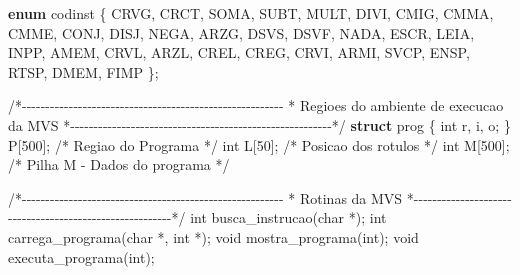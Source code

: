 \documentclass[
  brazilian,
  letterpaper,
]{book}
\newenvironment{Shaded}{\begin{snugshade}}{\end{snugshade}}
\newcommand{\CommentTok}[1]{\textcolor[rgb]{0.37,0.37,0.37}{#1}}
\newcommand{\DataTypeTok}[1]{\textcolor[rgb]{0.68,0.00,0.00}{#1}}
\newcommand{\DecValTok}[1]{\textcolor[rgb]{0.68,0.00,0.00}{#1}}
\newcommand{\KeywordTok}[1]{\textcolor[rgb]{0.00,0.23,0.31}{\textbf{#1}}}
\newcommand{\NormalTok}[1]{\textcolor[rgb]{0.00,0.23,0.31}{#1}}
\newcommand{\OperatorTok}[1]{\textcolor[rgb]{0.37,0.37,0.37}{#1}}
\theoremstyle{plain}
\theoremstyle{definition}
\theoremstyle{remark}
\begin{document}
\begin{Shaded}
\begin{Highlighting}[]
\KeywordTok{enum}\NormalTok{ codinst}
\OperatorTok{\{}
\NormalTok{    CRVG}\OperatorTok{,}
\NormalTok{    CRCT}\OperatorTok{,}
\NormalTok{    SOMA}\OperatorTok{,}
\NormalTok{    SUBT}\OperatorTok{,}
\NormalTok{    MULT}\OperatorTok{,}
\NormalTok{    DIVI}\OperatorTok{,}
\NormalTok{    CMIG}\OperatorTok{,}
\NormalTok{    CMMA}\OperatorTok{,}
\NormalTok{    CMME}\OperatorTok{,}
\NormalTok{    CONJ}\OperatorTok{,}
\NormalTok{    DISJ}\OperatorTok{,}
\NormalTok{    NEGA}\OperatorTok{,}
\NormalTok{    ARZG}\OperatorTok{,}
\NormalTok{    DSVS}\OperatorTok{,}
\NormalTok{    DSVF}\OperatorTok{,}
\NormalTok{    NADA}\OperatorTok{,}
\NormalTok{    ESCR}\OperatorTok{,}
\NormalTok{    LEIA}\OperatorTok{,}
\NormalTok{    INPP}\OperatorTok{,}
\NormalTok{    AMEM}\OperatorTok{,}
\NormalTok{    CRVL}\OperatorTok{,}
\NormalTok{    ARZL}\OperatorTok{,}
\NormalTok{    CREL}\OperatorTok{,}
\NormalTok{    CREG}\OperatorTok{,}
\NormalTok{    CRVI}\OperatorTok{,}
\NormalTok{    ARMI}\OperatorTok{,}
\NormalTok{    SVCP}\OperatorTok{,}
\NormalTok{    ENSP}\OperatorTok{,}
\NormalTok{    RTSP}\OperatorTok{,}
\NormalTok{    DMEM}\OperatorTok{,}
\NormalTok{    FIMP}
\OperatorTok{\};}

\CommentTok{/*{-}{-}{-}{-}{-}{-}{-}{-}{-}{-}{-}{-}{-}{-}{-}{-}{-}{-}{-}{-}{-}{-}{-}{-}{-}{-}{-}{-}{-}{-}{-}{-}{-}{-}{-}{-}{-}{-}{-}{-}{-}{-}{-}{-}{-}{-}{-}{-}{-}{-}{-}{-}{-}{-}{-}{-}}
\CommentTok{ * Regioes do ambiente de execucao da MVS                    }
\CommentTok{ *{-}{-}{-}{-}{-}{-}{-}{-}{-}{-}{-}{-}{-}{-}{-}{-}{-}{-}{-}{-}{-}{-}{-}{-}{-}{-}{-}{-}{-}{-}{-}{-}{-}{-}{-}{-}{-}{-}{-}{-}{-}{-}{-}{-}{-}{-}{-}{-}{-}{-}{-}{-}{-}{-}{-}{-}*/}
\KeywordTok{struct}\NormalTok{ prog}
\OperatorTok{\{}
    \DataTypeTok{int}\NormalTok{ r}\OperatorTok{,}\NormalTok{ i}\OperatorTok{,}\NormalTok{ o}\OperatorTok{;}
\OperatorTok{\}}\NormalTok{ P}\OperatorTok{[}\DecValTok{500}\OperatorTok{];} \CommentTok{/* Regiao do Programa */}
\DataTypeTok{int}
\NormalTok{    L}\OperatorTok{[}\DecValTok{50}\OperatorTok{];} \CommentTok{/* Posicao dos rotulos */}
\DataTypeTok{int}
\NormalTok{    M}\OperatorTok{[}\DecValTok{500}\OperatorTok{];} \CommentTok{/* Pilha M {-} Dados do programa */}

\CommentTok{/*{-}{-}{-}{-}{-}{-}{-}{-}{-}{-}{-}{-}{-}{-}{-}{-}{-}{-}{-}{-}{-}{-}{-}{-}{-}{-}{-}{-}{-}{-}{-}{-}{-}{-}{-}{-}{-}{-}{-}{-}{-}{-}{-}{-}{-}{-}{-}{-}{-}{-}{-}{-}{-}{-}{-}{-}}
\CommentTok{ * Rotinas da MVS                   }
\CommentTok{ *{-}{-}{-}{-}{-}{-}{-}{-}{-}{-}{-}{-}{-}{-}{-}{-}{-}{-}{-}{-}{-}{-}{-}{-}{-}{-}{-}{-}{-}{-}{-}{-}{-}{-}{-}{-}{-}{-}{-}{-}{-}{-}{-}{-}{-}{-}{-}{-}{-}{-}{-}{-}{-}{-}{-}{-}*/}
\DataTypeTok{int}\NormalTok{ busca\_instrucao}\OperatorTok{(}\DataTypeTok{char} \OperatorTok{*);}
\DataTypeTok{int}\NormalTok{ carrega\_programa}\OperatorTok{(}\DataTypeTok{char} \OperatorTok{*,} \DataTypeTok{int} \OperatorTok{*);}
\DataTypeTok{void}\NormalTok{ mostra\_programa}\OperatorTok{(}\DataTypeTok{int}\OperatorTok{);}
\DataTypeTok{void}\NormalTok{ executa\_programa}\OperatorTok{(}\DataTypeTok{int}\OperatorTok{);}


\end{Highlighting}
\end{Shaded}
\end{document}
